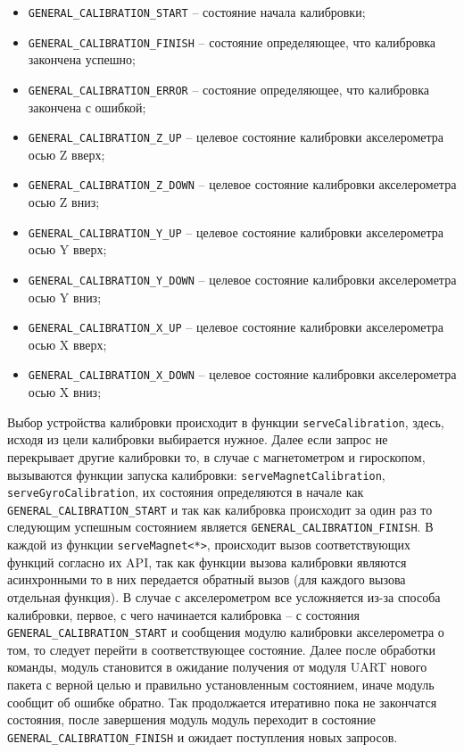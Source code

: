 \begin{itemize}
    \item \lstinline{GENERAL_CALIBRATION_START} -- состояние начала калибровки;
     \item \lstinline{GENERAL_CALIBRATION_FINISH} -- состояние определяющее, что калибровка закончена успешно;
     \item \lstinline{GENERAL_CALIBRATION_ERROR} -- состояние определяющее, что калибровка закончена с ошибкой;
     \item \lstinline{GENERAL_CALIBRATION_Z_UP} -- целевое состояние калибровки акселерометра осью Z вверх;
     \item \lstinline{GENERAL_CALIBRATION_Z_DOWN} -- целевое состояние калибровки акселерометра осью Z вниз; 
     \item \lstinline{GENERAL_CALIBRATION_Y_UP} -- целевое состояние калибровки акселерометра осью Y вверх; 
     \item \lstinline{GENERAL_CALIBRATION_Y_DOWN} -- целевое состояние калибровки акселерометра осью Y вниз; 
     \item \lstinline{GENERAL_CALIBRATION_X_UP} -- целевое состояние калибровки акселерометра осью X вверх; 
     \item \lstinline{GENERAL_CALIBRATION_X_DOWN} -- целевое состояние калибровки акселерометра осью X вниз; 
\end{itemize}

Выбор устройства калибровки происходит в функции \lstinline{serveCalibration}, здесь, исходя из цели калибровки выбирается нужное. Далее если запрос не
перекрывает другие калибровки то, в случае с магнетометром и гироскопом, вызываются функции запуска калибровки: \lstinline{serveMagnetCalibration},
\lstinline{serveGyroCalibration}, их состояния определяются в начале как \lstinline{GENERAL_CALIBRATION_START} и так как калибровка происходит за один раз
то следующим успешным состоянием является \lstinline{GENERAL_CALIBRATION_FINISH}. В каждой из функции \lstinline{serveMagnet<*>}, происходит вызов соответствующих
функций согласно их API, так как функции вызова калибровки являются асинхронными то в них передается обратный вызов (для каждого вызова отдельная функция).
В случае с акселерометром все усложняется из-за способа калибровки, первое, с чего начинается калибровка -- с состояния \lstinline{GENERAL_CALIBRATION_START} и
сообщения модулю калибровки акселерометра о том, то следует перейти в соответствующее состояние. Далее после обработки команды, модуль становится в ожидание получения
от модуля UART нового пакета с верной целью и правильно установленным состоянием, иначе модуль сообщит об ошибке обратно. Так продолжается итеративно пока не закончатся
состояния, после завершения модуль модуль переходит в состояние \lstinline{GENERAL_CALIBRATION_FINISH} и ожидает поступления новых запросов.

